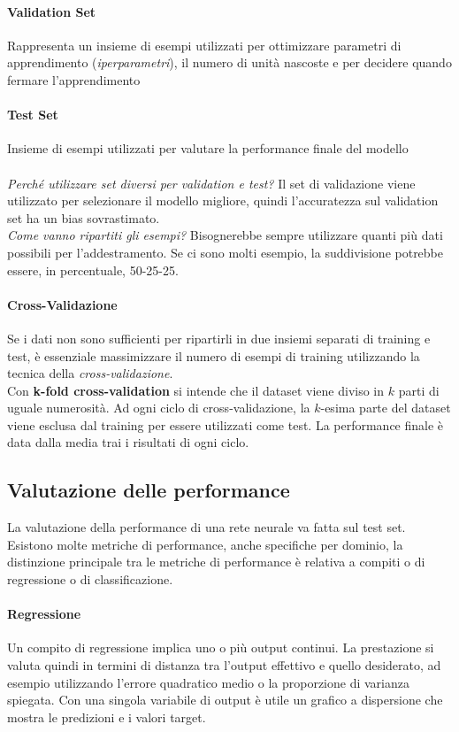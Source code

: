 \documentclass[12pt, a4paper]{article}
\begin{document}
\paragraph{Validation Set}
Rappresenta un insieme di esempi utilizzati per ottimizzare parametri di apprendimento (\textit{iperparametri}), il numero di unità nascoste e per decidere quando fermare l'apprendimento

\paragraph{Test Set}
Insieme di esempi utilizzati per valutare la performance finale del modello\\
\\
\textit{Perché utilizzare set diversi per validation e test?} Il set di validazione viene utilizzato per selezionare il modello migliore, quindi l'accuratezza sul validation set ha un bias sovrastimato.\\
\textit{Come vanno ripartiti gli esempi?} Bisognerebbe sempre utilizzare quanti più dati possibili per l'addestramento. Se ci sono molti esempio, la suddivisione potrebbe essere, in percentuale, 50-25-25.

\paragraph{Cross-Validazione}
Se i dati non sono sufficienti per ripartirli in due insiemi separati di training e test, è essenziale massimizzare il numero di esempi di training utilizzando la tecnica della \textit{cross-validazione}.\\
Con \textbf{k-fold cross-validation} si intende che il dataset viene diviso in \(k\) parti di uguale numerosità. Ad ogni ciclo di cross-validazione, la \(k\)-esima parte del dataset viene esclusa dal training per essere utilizzati come test. La performance finale è data dalla media trai i risultati di ogni ciclo.

\subsection{Valutazione delle performance}
La valutazione della performance di una rete neurale va fatta sul test set. Esistono molte metriche di performance, anche specifiche per dominio, la distinzione principale tra le metriche di performance è relativa a compiti o di regressione o di classificazione.\\
\paragraph{Regressione} Un compito di regressione implica uno o più output continui. La prestazione si valuta quindi in termini di distanza tra l'output effettivo e quello desiderato, ad esempio utilizzando l'errore quadratico medio o la proporzione di varianza spiegata. Con una singola variabile di output è utile un grafico a dispersione che mostra le predizioni e i valori target.
\end{document}
